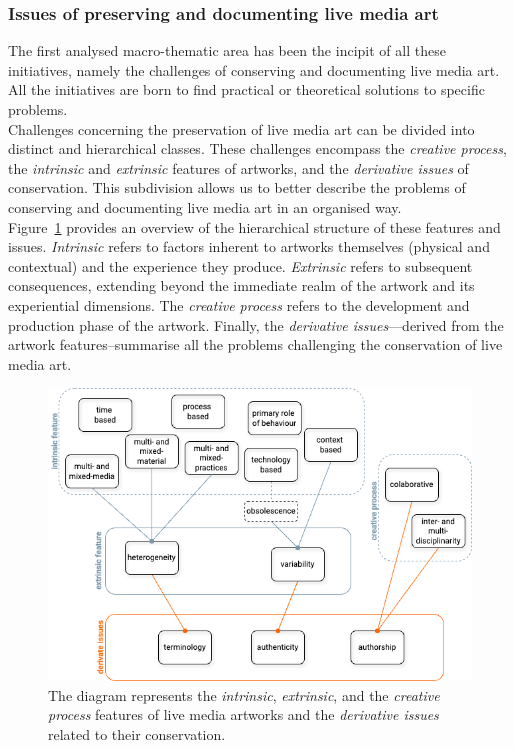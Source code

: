 \subsubsection{Issues of preserving and documenting live media art}
The first analysed macro-thematic area has been the incipit of all these initiatives, namely the challenges of conserving and documenting live media art. All the initiatives are born to find practical or theoretical solutions to specific problems.\\ 
Challenges concerning the preservation of live media art can be divided into distinct and hierarchical classes. These challenges encompass the \textit{creative process}, the \textit{intrinsic} and \textit{extrinsic} features of artworks, and the \textit{derivative issues} of conservation. This subdivision allows us to better describe the problems of conserving and documenting live media art in an organised way.\\
Figure~\ref{fig:c1-issues} provides an overview of the hierarchical structure of these features and issues. \textit{Intrinsic} refers to factors inherent to artworks themselves (physical and contextual) and the experience they produce. \textit{Extrinsic} refers to subsequent consequences, extending beyond the immediate realm of the artwork and its experiential dimensions. The \textit{creative process} refers to the development and production phase of the artwork. Finally, the \textit{derivative issues}—derived from the artwork features–summarise all the problems challenging the conservation of live media art. 

\begin{figure}[!h]
    \centering
    \includegraphics[width=\textwidth]{chapters/1-state_of_the_art/image/graph-issues.png}
    \caption{The diagram represents the \textit{intrinsic}, \textit{extrinsic}, and the \textit{creative process} features of live media artworks and the \textit{derivative issues} related to their conservation.}
    \label{fig:c1-issues}
\end{figure}

